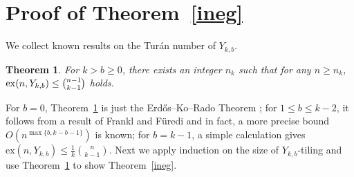 \documentclass[11pt, reqno]{amsart}    	%
\newtheorem{thm}{Theorem}[section]
\theoremstyle{definition}
\def\ex{\text{ex}}
\numberwithin{equation}{section}
\begin{document}
	
	\section{Proof of Theorem~\ref{ineg}}
	
	We collect known results on the Tur\'an number of $Y_{k,b}$.
	
	\begin{thm}\cite{Erd1974Intersection,Peter1985Forbidding}  \label{FrFu}
		For $k > b \ge 0$, there exists an integer $n_k$ such that for any $n \ge n_k$, ${\rm ex}(n,Y_{k, b}) \le \binom{n-1}{k-1}$ holds.
	\end{thm}
	For $b=0$, Theorem~\ref{FrFu} is just the Erd\H{o}s--Ko--Rado Theorem \cite{Erd1974Intersection}; for $1\le b\le k-2$, it follows from a result of Frankl and F\"uredi \cite{Peter1985Forbidding} and in fact, a more precise bound $O( n^{\max \{b, k-b-1 \}})$ is known; for $b=k-1$, a simple calculation gives $\ex(n,Y_{k, b}) \le \frac{1}{k}\binom{n}{k-1}$. Next we apply induction on the size of $Y_{k,b}$-tiling and use Theorem~\ref{FrFu} to show Theorem~\ref{ineg}.
	
\end{document}
